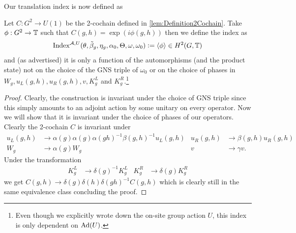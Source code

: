 \documentclass[11pt,a4paper,twoside]{article}
\numberwithin{equation}{section}
\begin{document}
	Our translation index is now defined as
	\begin{definition}\label{def:DefinitionOfTheH2ValuedIndex}
		Let $C:G^2\rightarrow U(1)$ be the 2-cochain defined in \ref{lem:Definition2Cochain}. Take $\phi:G^2\rightarrow\mathbb T$ such that $C(g,h)=\exp(i\phi(g,h))$ then we define the index as
		\begin{equation}
			\textrm{Index}^{\mathcal A,U}(\theta,\tilde{\beta}_g,\eta_g,\alpha_0,\Theta,\omega,\omega_0)\vcentcolon=\expval{\phi}\in H^2(G,\mathbb T)
		\end{equation}
		and (as advertised) it is only a function of the automorphisms (and the product state) not on the choice of the GNS triple of $\omega_0$ or on the choice of phases in $W_g,u_L(g,h),u_R(g,h),v,K_g^L$ and $K_g^R$.\footnote{Even though we explicitly wrote down the on-site group action $U$, this index is only dependent on $\Ad{U}$.}
	\end{definition}
	\begin{proof}
		Clearly, the construction is invariant under the choice of GNS triple since this simply amounts to an adjoint action by some unitary on every operator. Now we will show that it is invariant under the choice of phases of our operators. Clearly the 2-cochain $C$ is invariant under
		\begin{align}
			u_L(g,h)&\rightarrow \alpha(g)\alpha(g)\alpha(gh)^{-1}\beta(g,h)^{-1} u_L(g,h)&u_R(g,h)&\rightarrow \beta(g,h)u_R(g,h)\\
			W_g&\rightarrow\alpha(g)W_g&v&\rightarrow \gamma v.
		\end{align}
		Under the transformation
		\begin{align}
			K_g^L&\rightarrow \delta(g)^{-1}K_g^L&K_g^R&\rightarrow \delta(g)K_g^R
		\end{align}
		we get $C(g,h)\rightarrow \delta(g)\delta(h)\delta(gh)^{-1}C(g,h)$ which is clearly still in the same equivalence class concluding the proof.
	\end{proof}
\end{document}
